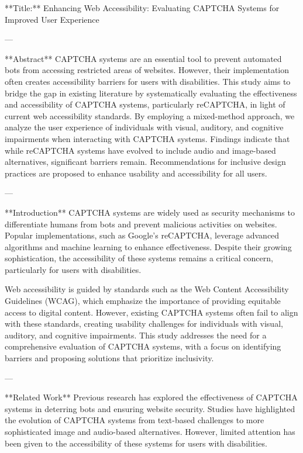 **Title:** Enhancing Web Accessibility: Evaluating CAPTCHA Systems for Improved User Experience  

---

**Abstract**  
CAPTCHA systems are an essential tool to prevent automated bots from accessing restricted areas of websites. However, their implementation often creates accessibility barriers for users with disabilities. This study aims to bridge the gap in existing literature by systematically evaluating the effectiveness and accessibility of CAPTCHA systems, particularly reCAPTCHA, in light of current web accessibility standards. By employing a mixed-method approach, we analyze the user experience of individuals with visual, auditory, and cognitive impairments when interacting with CAPTCHA systems. Findings indicate that while reCAPTCHA systems have evolved to include audio and image-based alternatives, significant barriers remain. Recommendations for inclusive design practices are proposed to enhance usability and accessibility for all users.

---

**Introduction**  
CAPTCHA systems are widely used as security mechanisms to differentiate humans from bots and prevent malicious activities on websites. Popular implementations, such as Google's reCAPTCHA, leverage advanced algorithms and machine learning to enhance effectiveness. Despite their growing sophistication, the accessibility of these systems remains a critical concern, particularly for users with disabilities.  

Web accessibility is guided by standards such as the Web Content Accessibility Guidelines (WCAG), which emphasize the importance of providing equitable access to digital content. However, existing CAPTCHA systems often fail to align with these standards, creating usability challenges for individuals with visual, auditory, and cognitive impairments. This study addresses the need for a comprehensive evaluation of CAPTCHA systems, with a focus on identifying barriers and proposing solutions that prioritize inclusivity.  

---

**Related Work**  
Previous research has explored the effectiveness of CAPTCHA systems in deterring bots and ensuring website security. Studies have highlighted the evolution of CAPTCHA systems from text-based challenges to more sophisticated image and audio-based alternatives. However, limited attention has been given to the accessibility of these systems for users with disabilities.  

